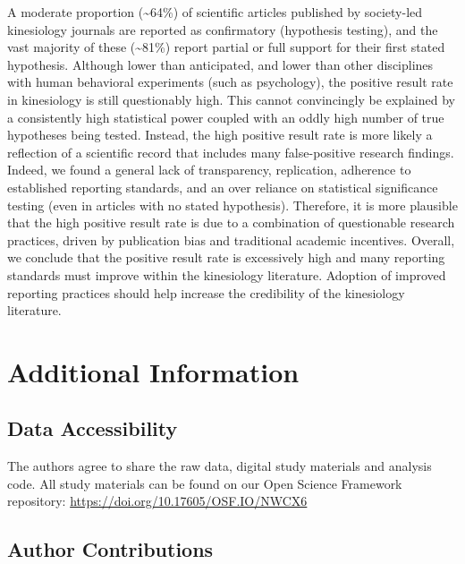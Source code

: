 \documentclass[]{cik}%
\begin{document}
A moderate proportion (\textasciitilde64\%) of scientific articles
published by society-led kinesiology journals are reported as
confirmatory (hypothesis testing), and the vast majority of these
(\textasciitilde81\%) report partial or full support for their first
stated hypothesis. Although lower than anticipated, and lower than other
disciplines with human behavioral experiments (such as psychology), the
positive result rate in kinesiology is still questionably high. This
cannot convincingly be explained by a consistently high statistical
power coupled with an oddly high number of true hypotheses being tested.
Instead, the high positive result rate is more likely a reflection of a
scientific record that includes many false-positive research findings.
Indeed, we found a general lack of transparency, replication, adherence
to established reporting standards, and an over reliance on statistical
significance testing (even in articles with no stated hypothesis).
Therefore, it is more plausible that the high positive result rate is
due to a combination of questionable research practices, driven by
publication bias and traditional academic incentives. Overall, we
conclude that the positive result rate is excessively high and many
reporting standards must improve within the kinesiology literature.
Adoption of improved reporting practices should help increase the
credibility of the kinesiology literature.

\newpage

\hypertarget{additional-information}{%
\section{Additional Information}\label{additional-information}}

\hypertarget{data}{%
\subsection{Data Accessibility}\label{data}}

The authors agree to share the raw data, digital study materials and
analysis code. All study materials can be found on our Open Science
Framework repository: \url{https://doi.org/10.17605/OSF.IO/NWCX6}

\hypertarget{author-contributions}{%
\subsection{Author Contributions}\label{author-contributions}}
\end{document}
